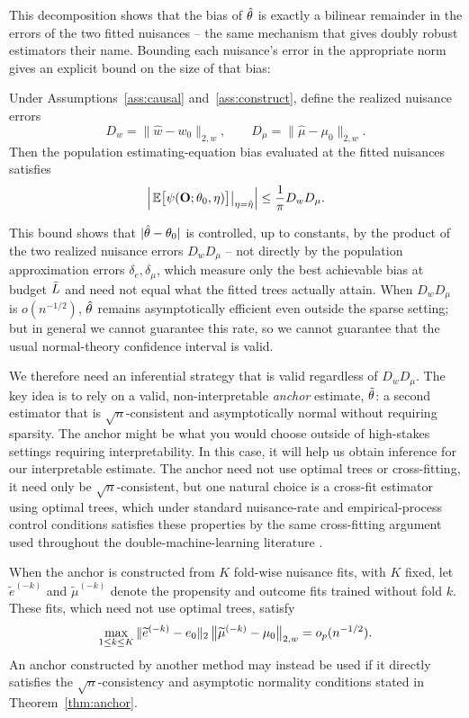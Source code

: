 \documentclass[12pt]{article}
\begin{document}
This decomposition shows that the bias of $\hat{\theta}$ is exactly a bilinear remainder in the errors of the two fitted nuisances -- the same mechanism that gives doubly robust estimators their name. Bounding each nuisance's error in the appropriate norm gives an explicit bound on the size of that bias:

\begin{lemma}
\label{lem:biasbound}
Under Assumptions~\ref{ass:causal} and~\ref{ass:construct}, define the
realized nuisance errors
\[
  D_w=\|\hat w-w_0\|_{2,w},
  \qquad
  D_\mu=\|\hat\mu-\mu_0\|_{2,w}.
\]
Then the population estimating-equation bias evaluated at the fitted
nuisances satisfies
\[
  \left|
    \left.
    \mathbb{E}\bigl[\psi(\mathbf{O};\theta_0,\eta)\bigr]
    \right|_{\eta=\hat\eta}
  \right|
  \le
  \frac{1}{\pi}D_wD_\mu .
\]
\end{lemma}

This bound shows that $|\hat{\theta} - \theta_0|$ is controlled, up to constants, by the product of the two realized nuisance errors $D_w D_\mu$ -- not directly by the population approximation errors $\delta_e, \delta_\mu$, which measure only the best achievable bias at budget $\bar{L}$ and need not equal what the fitted trees actually attain. When $D_w D_\mu$ is $o(n^{-1/2})$, $\hat{\theta}$ remains asymptotically efficient even outside the sparse setting; but in general we cannot guarantee this rate, so we cannot guarantee that the usual normal-theory confidence interval is valid.

We therefore need an inferential strategy that is valid regardless of $D_w D_\mu$. The key idea is to rely on a valid, non-interpretable \emph{anchor} estimate, $\tilde{\theta}$: a second estimator that is $\sqrt n$-consistent and asymptotically normal without requiring sparsity. The anchor might be what you would choose outside of high-stakes settings requiring interpretability. In this case, it will help us obtain inference for our interpretable estimate. The anchor need not use optimal trees or cross-fitting, it need only be $\sqrt n$-consistent, but one natural choice is a cross-fit estimator using optimal trees, which under standard nuisance-rate and empirical-process control conditions satisfies these properties by the same cross-fitting argument used throughout the double-machine-learning literature \citep{chernozhukov2018}.

\begin{assumption}\label{ass:rate}
When the anchor is constructed from $K$ fold-wise nuisance fits, with $K$
fixed, let $\widetilde e^{(-k)}$ and $\widetilde\mu^{(-k)}$ denote the
propensity and outcome fits trained without fold $k$. These fits, which need
not use optimal trees, satisfy
\[
  \max_{1\le k\le K}
  \|\widetilde e^{(-k)}-e_0\|_2\,
  \bigl\|\widetilde\mu^{(-k)}-\mu_0\bigr\|_{2,w}
  =
  o_p(n^{-1/2}).
\]
An anchor constructed by another method may instead be used if it directly
satisfies the $\sqrt n$-consistency and asymptotic normality conditions stated
in Theorem~\ref{thm:anchor}.
\end{assumption}
\end{document}
